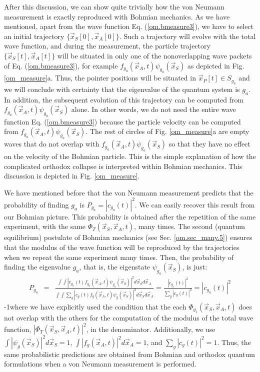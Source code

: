 \documentclass[onecolumn,nofootinbib, secnumarabic, amsmath, nobibnotes,12pt,aps,pra]{revtex4-1}
\newcommand{\fref}[1]{Fig. \ref{#1}}
\newcommand{\sref}[1]{Sec. \ref{#1}}
\newcommand{\eref}[1]{Eq. (\ref{#1})}
\begin{document}
After this discussion, we can show quite trivially how the von
Neumann measurement is exactly reproduced with Bohmian mechanics. As
we have mentioned, apart from the wave function \eref{om.bmeasure3}, we
have to select an initial trajectory $\{\vec x_S[0],\vec x_A[0]\}$.
Such a trajectory will evolve with the total wave function, and
during the measurement, the particle trajectory $\{\vec x_S[t],\vec
x_A[t]\}$ will be situated in only one of the nonoverlapping wave
packets of \eref{om.bmeasure3}, for example $f_{g_a}(\vec x_A,t)
\psi_{g_a}(\vec x_S)$ as depicted in \fref{om_measure}a. Thus, the
pointer positions will be situated in $\vec x_P[t]\in S_{g_a}$ and
we will conclude with certainty that the eigenvalue of the quantum
system is $g_a$. In addition, the subsequent evolution of this
trajectory can be computed from $f_{g_a}(\vec x_A,t) \psi_{g_a}(\vec
x_S)$ alone. In other words, we do not need the entire wave function
\eref{om.bmeasure3} because the particle velocity can be computed
from $f_{g_a}(\vec x_A,t) \psi_{g_a}(\vec x_S)$. The rest of circles
of \fref{om_measure}a are empty waves that do not overlap with
$f_{g_a}(\vec x_A,t) \psi_{g_a}(\vec x_S)$ so that they have no
effect on the velocity of the Bohmian particle. This is the simple
explanation of how the complicated orthodox collapse is interpreted
within Bohmian mechanics. This discussion is depicted in
\fref{om_measure}.

We have mentioned before that the von Neumann measurement predicts that the probability of finding $g_a$ is $P_{g_a} = |c_{g_a}(t)|^2$. We can easily recover this result from our Bohmian picture. This probability is obtained after the repetition of the same experiment, with the same $\Phi_T(\vec x_S,\vec x_A,t)$, many times. The second (quantum equilibrium) postulate of Bohmian mechanics (see \sref{om.sec_many.5}) ensures that the modulus of the wave function will be reproduced by the trajectories when we repeat the same experiment many times. Then, the probability of finding the eigenvalue $g_a$, that is, the eigenstate $\psi_{g_a}(\vec x_S)$, is just:
\begin{eqnarray}
P_{g_a} &=& \frac {\int \int |c_{g_a}(t) f_{g_a}(\vec x_A,t) \psi_{g_a}(\vec x_S)|^2 d\vec x_S d\vec x_A} {\int \int \sum_{g} |c_g(t) f_g(\vec x_A,t) \psi_g(\vec x_S)|^2 d\vec x_S d\vec x_A}= \frac {|c_{g_a}(t)|^2} {\sum_{g} |c_g(t)|^2} = |c_{g_a}(t)|^2
\end{eqnarray}
\looseness-1where we have explicitly used the condition that the each
\textit{$\Phi_{g_1}(\vec x_S,\vec x_A,t)$} does not overlap with the others for the
computation of the modulus of the total wave function,
\textit{$|\Phi_T(\vec x_S,\vec x_A,t)|^2$}, in the denominator.
Additionally, we use $\int |\psi_g(\vec x_S)|^2 d\vec x_S = 1$,
$\int |f_g(\vec x_A,t)|^2 d\vec x_A = 1$, and $\sum_{g} |c_g(t)|^2 =
1$. Thus, the same probabilistic predictions are obtained from
Bohmian and orthodox quantum formulations when a von Neumann
measurement is performed.
\end{document}
